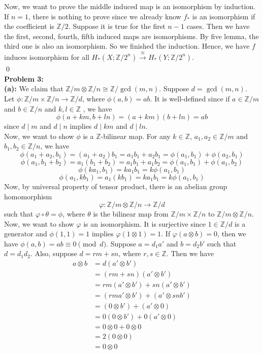 \documentclass[12pt]{amsart}
\newcommand{\Z}{\mathbb{Z}}
\begin{document}
Now, we want to prove the middle induced map is an isomorphism by induction.
If $n=1$, there is nothing to prove since we already know $f_\ast$ is an isomorphism if the coefficient is $\Z/2$.
Suppose it is true for the first $n-1$ cases. Then we have the first, second, fourth, fifth induced maps are isomorphisms. By five lemma, the third one is also an isomorphism. So we finished the induction. Hence, we have $f$ induces isomorphism for all $H_\ast(X;\Z/2^n)\xrightarrow[]{\cong}H_\ast(Y;\Z/2^n)$.
\\\qed\\
\textbf{Problem 3:}
\\\textbf{(a):} We claim that $\Z/m\otimes \Z/n\cong \Z/\gcd(m,n)$. Suppose $d=\gcd(m,n)$.\\
Let $\phi:\Z/m\times \Z/n\to \Z/d$, where $\phi(a,b)=ab$. It is well-defined since if $a\in\Z/m$ and $b\in\Z/n$ and $k,l\in\Z$ , we have
\[\phi(a+km,b+ln)=(a+km)(b+ln)=ab\]
since $d\mid m$ and $d\mid n$ implies $d\mid km$ and $d\mid ln$.\\
Now, we want to show $\phi$ is a $\Z$-bilinear map. For any $k\in\Z$, $a_1,a_2\in\Z/m$ and $b_1,b_2\in\Z/n$, we have
\[\phi(a_1+a_2,b_1)=(a_1+a_2)b_1=a_1b_1+a_2b_1=\phi(a_1,b_1)+\phi(a_2,b_1)\]
\[\phi(a_1,b_1+b_2)=a_1(b_1+b_2)=a_1b_1+a_1b_2=\phi(a_1,b_1)+\phi(a_1,b_2)\]
\[\phi(ka_1,b_1)=ka_1b_1=k\phi(a_1,b_1)\]
\[\phi(a_1,kb_1)=a_1(kb_1)=ka_1b_1=k\phi(a_1,b_1)\]
Now, by universal property of tensor product, there is an abelian group homomorphism
\[\varphi:\Z/m\otimes \Z/n\to \Z/d\]
such that $\varphi\circ \theta=\phi$, where $\theta$ is the bilinear map from $\Z/m\times \Z/n$ to $\Z/m\otimes \Z/n$. Now, we want to show $\varphi$ is an isomorphism.
It is surjective since $1\in\Z/d$ is a generator and $\phi(1,1)=1$ implies $\varphi(1\otimes 1)=1$. If $\varphi(a\otimes b)=0$, then we have $\phi(a,b)=ab\equiv 0\pmod d$. Suppose $a=d_1a'$ and $b=d_2b'$ such that $d=d_1d_2$. Also, suppose $d=rm+sn$, where $r,s\in\Z$. Then we have
\begin{align*}
    a\otimes b & =d(a'\otimes b')                   \\
               & =(rm+sn)(a'\otimes b')             \\
               & =rm(a'\otimes b')+sn(a'\otimes b') \\
               & =(rma'\otimes b')+(a'\otimes snb') \\
               & =(0\otimes b')+(a'\otimes 0)       \\
               & =0(0\otimes b')+0(a'\otimes 0)     \\
               & =0\otimes 0+0\otimes 0             \\
               & =2(0\otimes 0)                     \\
               & =0\otimes 0
\end{align*}
\end{document}
